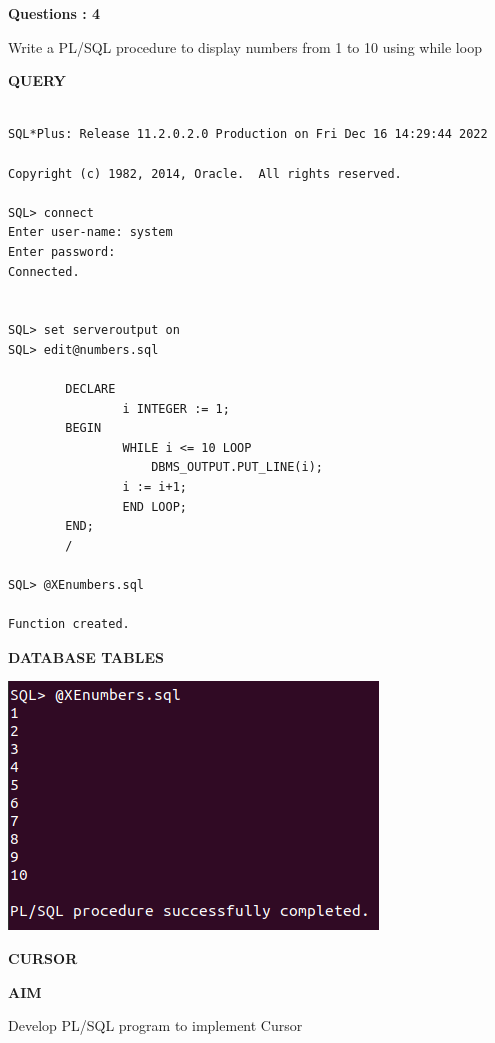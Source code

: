 \documentclass[a4paper,12pt]{report}
\begin{document}
\begin{flushleft}
    \textbf{Questions : 4}
\end{flushleft}
Write a PL/SQL procedure to display numbers from 1 to 10 using while loop
\begin{flushleft}
		\textbf{QUERY }
	\end{flushleft}
 \begin{verbatim}
 
SQL*Plus: Release 11.2.0.2.0 Production on Fri Dec 16 14:29:44 2022

Copyright (c) 1982, 2014, Oracle.  All rights reserved.

SQL> connect
Enter user-name: system
Enter password:
Connected.


SQL> set serveroutput on
SQL> edit@numbers.sql

		DECLARE
    			i INTEGER := 1;
		BEGIN
    			WHILE i <= 10 LOOP 
        			DBMS_OUTPUT.PUT_LINE(i);
    			i := i+1;
    			END LOOP;
		END;
		/

SQL> @XEnumbers.sql

Function created.

\end{verbatim}
\begin{flushleft}
		\textbf{DATABASE TABLES} 
\end{flushleft} 

\includegraphics[scale=0.7]{NUMBERS.png}

\newpage
\begin{center}
		\large\textbf{CURSOR}
	\end{center}
	
	\begin{flushleft}
		\textbf{AIM }
	\end{flushleft} 
	 Develop PL/SQL program to implement Cursor
\end{document}
